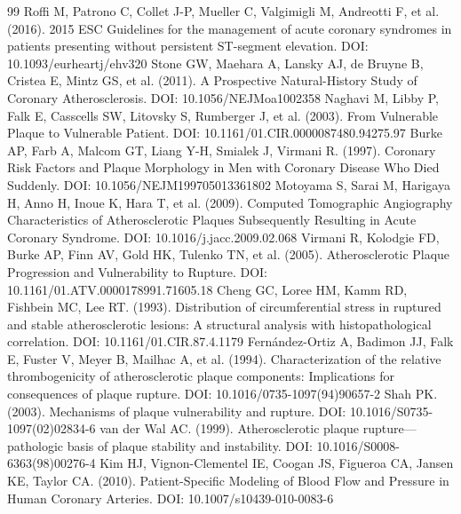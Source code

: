 \documentclass[preprint,12pt]{elsarticle}
\begin{document}
\begin{thebibliography}{99}
 Roffi M, Patrono C, Collet J-P, Mueller C, Valgimigli M, Andreotti F, et al. (2016). 2015 ESC Guidelines for the management of acute coronary syndromes in patients presenting without persistent ST-segment elevation. DOI: 10.1093/eurheartj/ehv320
 Stone GW, Maehara A, Lansky AJ, de Bruyne B, Cristea E, Mintz GS, et al. (2011). A Prospective Natural-History Study of Coronary Atherosclerosis. DOI: 10.1056/NEJMoa1002358
 Naghavi M, Libby P, Falk E, Casscells SW, Litovsky S, Rumberger J, et al. (2003). From Vulnerable Plaque to Vulnerable Patient. DOI: 10.1161/01.CIR.0000087480.94275.97
 Burke AP, Farb A, Malcom GT, Liang Y-H, Smialek J, Virmani R. (1997). Coronary Risk Factors and Plaque Morphology in Men with Coronary Disease Who Died Suddenly. DOI: 10.1056/NEJM199705013361802
 Motoyama S, Sarai M, Harigaya H, Anno H, Inoue K, Hara T, et al. (2009). Computed Tomographic Angiography Characteristics of Atherosclerotic Plaques Subsequently Resulting in Acute Coronary Syndrome. DOI: 10.1016/j.jacc.2009.02.068
 Virmani R, Kolodgie FD, Burke AP, Finn AV, Gold HK, Tulenko TN, et al. (2005). Atherosclerotic Plaque Progression and Vulnerability to Rupture. DOI: 10.1161/01.ATV.0000178991.71605.18
 Cheng GC, Loree HM, Kamm RD, Fishbein MC, Lee RT. (1993). Distribution of circumferential stress in ruptured and stable atherosclerotic lesions: A structural analysis with histopathological correlation. DOI: 10.1161/01.CIR.87.4.1179
 Fernández-Ortiz A, Badimon JJ, Falk E, Fuster V, Meyer B, Mailhac A, et al. (1994). Characterization of the relative thrombogenicity of atherosclerotic plaque components: Implications for consequences of plaque rupture. DOI: 10.1016/0735-1097(94)90657-2
 Shah PK. (2003). Mechanisms of plaque vulnerability and rupture. DOI: 10.1016/S0735-1097(02)02834-6
 van der Wal AC. (1999). Atherosclerotic plaque rupture—pathologic basis of plaque stability and instability. DOI: 10.1016/S0008-6363(98)00276-4
 Kim HJ, Vignon-Clementel IE, Coogan JS, Figueroa CA, Jansen KE, Taylor CA. (2010). Patient-Specific Modeling of Blood Flow and Pressure in Human Coronary Arteries. DOI: 10.1007/s10439-010-0083-6
\end{thebibliography}
\end{document}
